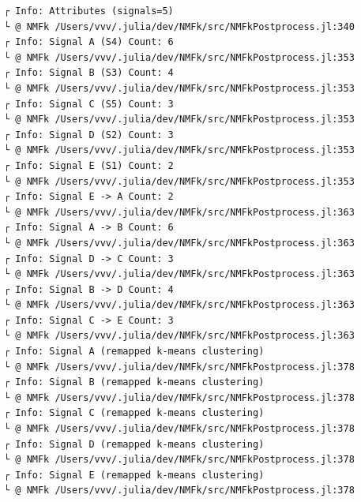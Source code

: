 \documentclass[11pt]{article}
\begin{document}
    \begin{Verbatim}[commandchars=\\\{\}]
┌ Info: Attributes (signals=5)
└ @ NMFk /Users/vvv/.julia/dev/NMFk/src/NMFkPostprocess.jl:340
┌ Info: Signal A (S4) Count: 6
└ @ NMFk /Users/vvv/.julia/dev/NMFk/src/NMFkPostprocess.jl:353
┌ Info: Signal B (S3) Count: 4
└ @ NMFk /Users/vvv/.julia/dev/NMFk/src/NMFkPostprocess.jl:353
┌ Info: Signal C (S5) Count: 3
└ @ NMFk /Users/vvv/.julia/dev/NMFk/src/NMFkPostprocess.jl:353
┌ Info: Signal D (S2) Count: 3
└ @ NMFk /Users/vvv/.julia/dev/NMFk/src/NMFkPostprocess.jl:353
┌ Info: Signal E (S1) Count: 2
└ @ NMFk /Users/vvv/.julia/dev/NMFk/src/NMFkPostprocess.jl:353
┌ Info: Signal E -> A Count: 2
└ @ NMFk /Users/vvv/.julia/dev/NMFk/src/NMFkPostprocess.jl:363
┌ Info: Signal A -> B Count: 6
└ @ NMFk /Users/vvv/.julia/dev/NMFk/src/NMFkPostprocess.jl:363
┌ Info: Signal D -> C Count: 3
└ @ NMFk /Users/vvv/.julia/dev/NMFk/src/NMFkPostprocess.jl:363
┌ Info: Signal B -> D Count: 4
└ @ NMFk /Users/vvv/.julia/dev/NMFk/src/NMFkPostprocess.jl:363
┌ Info: Signal C -> E Count: 3
└ @ NMFk /Users/vvv/.julia/dev/NMFk/src/NMFkPostprocess.jl:363
┌ Info: Signal A (remapped k-means clustering)
└ @ NMFk /Users/vvv/.julia/dev/NMFk/src/NMFkPostprocess.jl:378
┌ Info: Signal B (remapped k-means clustering)
└ @ NMFk /Users/vvv/.julia/dev/NMFk/src/NMFkPostprocess.jl:378
┌ Info: Signal C (remapped k-means clustering)
└ @ NMFk /Users/vvv/.julia/dev/NMFk/src/NMFkPostprocess.jl:378
┌ Info: Signal D (remapped k-means clustering)
└ @ NMFk /Users/vvv/.julia/dev/NMFk/src/NMFkPostprocess.jl:378
┌ Info: Signal E (remapped k-means clustering)
└ @ NMFk /Users/vvv/.julia/dev/NMFk/src/NMFkPostprocess.jl:378
    \end{Verbatim}

    \begin{center}
    \end{center}
    { \hspace*{\fill} \\}

    \begin{Verbatim}[commandchars=\\\{\}]

    \end{Verbatim}

    \begin{center}
    \end{center}
    { \hspace*{\fill} \\}
\end{document}

